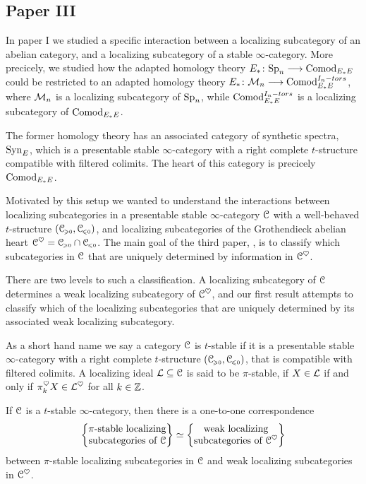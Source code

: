 \subsection{Paper III}

In paper I we studied a specific interaction between a localizing subcategory of an abelian category, and a localizing subcategory of a stable $\infty$-category. More precicely, we studied how the adapted homology theory $E_* \colon \mathrm{Sp}_{n} \longrightarrow \mathrm{Comod}_{E_*E}$ could be restricted to an adapted homology theory $E_* \colon \mathcal{M}_{n} \longrightarrow \mathrm{Comod}_{E_*E}^{I_n-tors}$, where $\mathcal{M}_{n}$ is a localizing subcategory of $\mathrm{Sp}_{n}$, while $\mathrm{Comod}_{E_*E}^{I_n-tors}$ is a localizing subcategory of $\mathrm{Comod}_{E_*E}$. 

The former homology theory has an associated category of synthetic spectra, $\mathrm{Syn}_{E}$, which is a presentable stable $\infty$-category with a right complete $t$-structure compatible with filtered colimits. The heart of this category is precicely $\mathrm{Comod}_{E_*E}$. 

Motivated by this setup we wanted to understand the interactions between localizing subcategories in a presentable stable $\infty$-category $\EuScript{C}$ with a well-behaved $t$-structure $(\EuScript{C}_{\hspace{-1pt}\scriptscriptstyle\geqslant 0}, \EuScript{C}_{\hspace{-1pt}\scriptscriptstyle\leqslant 0})$, and localizing subcategories of the Grothendieck abelian heart $\EuScript{C}^\heartsuit = \EuScript{C}_{\hspace{-1pt}\scriptscriptstyle\geqslant 0}\cap \EuScript{C}_{\hspace{-1pt}\scriptscriptstyle\leqslant 0}$. The main goal of the third paper, \cite{aambo_2024_localizing}, is to classify which subcategories in $\EuScript{C}$ that are uniquely determined by information in $\EuScript{C}^\heartsuit$. 

There are two levels to such a classification. A localizing subcategory of $\EuScript{C}$ determines a weak localizing subcategory of $\EuScript{C}^\heartsuit$, and our first result attempts to classify which of the localizing subcategories that are uniquely determined by its associated weak localizing subcategory. 

As a short hand name we say a category $\EuScript{C}$ is $t$-stable if it is a presentable stable $\infty$-category with a right complete $t$-structure $(\EuScript{C}_{\hspace{-1pt}\scriptscriptstyle\geqslant 0}, \EuScript{C}_{\hspace{-1pt}\scriptscriptstyle\leqslant 0})$, that is compatible with filtered colimits. A localizing ideal $\mathcal{L}\subseteq \EuScript{C}$ is said to be $\pi$-stable, if $X\in \mathcal{L}$ if and only if $\pi_k^\heartsuit X \in \mathcal{L}^\heartsuit$ for all $k\in \mathbb{Z}$.  

\begin{theorem}
    If $\EuScript{C}$ is a $t$-stable $\infty$-category, then there is a one-to-one correspondence
    \[\left\{ \begin{matrix} \pi\text{-stable localizing}\\ \text{subcategories of }\EuScript{C} \end{matrix} \right\} \simeq \left\{ \begin{matrix} \text{weak localizing}\\ \text{subcategories of }\EuScript{C}^\heartsuit \end{matrix} \right\}\]
    between $\pi$-stable localizing subcategories in $\EuScript{C}$ and weak localizing subcategories in $\EuScript{C}^\heartsuit$. 
\end{theorem}

